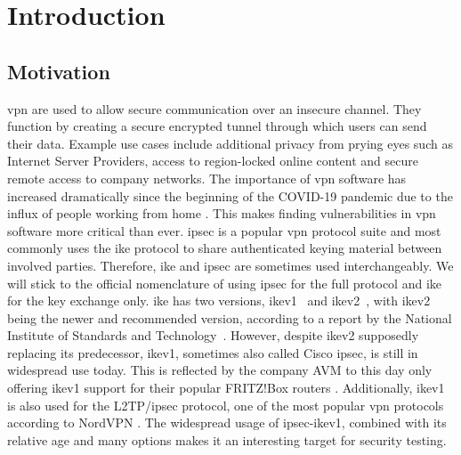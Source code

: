 %
%
% 
% 
% 

\chapter{Introduction}

\label{chap:Introduction}

\section{Motivation}
\ac{vpn} are used to allow secure communication over an insecure channel. They function by creating a secure encrypted tunnel through which users can send their data. Example use cases include additional privacy from prying eyes such as Internet Server Providers, access to region-locked online content and secure remote access to company networks. The importance of \ac{vpn} software has increased dramatically since the beginning of the COVID-19 pandemic due to the influx of people working from home \cite{DBLP:journals/cacm/FeldmannGLPPDWW21}. This makes finding vulnerabilities in \ac{vpn} software more critical than ever. %
\ac{ipsec} is a popular \ac{vpn} protocol suite and most commonly uses the \ac{ike} protocol to share authenticated keying material between involved parties. Therefore, \ac{ike} and \ac{ipsec} are sometimes used interchangeably. We will stick to the official nomenclature of using \ac{ipsec} for the full protocol and \ac{ike} for the key exchange only. \ac{ike} has two versions, \ac{ike}v1~\cite{rfc:ikev1} and \ac{ike}v2~\cite{rfc:ikev2}, with \ac{ike}v2 being the newer and recommended version, according to a report by the National Institute of Standards and Technology~\cite{nist791491}. However, despite \ac{ike}v2 supposedly replacing its predecessor, \ac{ike}v1, sometimes also called Cisco \ac{ipsec}, is still in widespread use today. This is reflected by the company AVM to this day only offering \ac{ike}v1 support for their popular FRITZ!Box routers \cite{avm2022}. Additionally, \ac{ike}v1 is also used for the L2TP/\ac{ipsec} protocol, one of the most popular \ac{vpn} protocols according to NordVPN \cite{nordvpn2021}. The widespread usage of \ac{ipsec}-\ac{ike}v1, combined with its relative age and many options makes it an interesting target for security testing.


